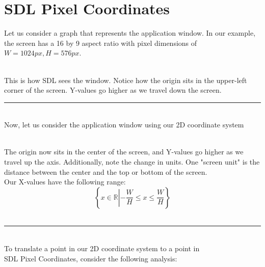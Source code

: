 \documentclass[11pt]{article}
\begin{document}
\section{SDL Pixel Coordinates}

Let us consider a graph that represents the application window.
In our example, the screen has a 16 by 9 aspect ratio with pixel
dimensions of $W=1024px, H=576px$.\\[5pt]

\\

This is how SDL sees the window. Notice how the origin sits in the
upper-left corner of the screen. Y-values go higher as we travel
down the screen.\\

\rule{12cm}{0.4pt}
\\

Now, let us consider the application window using our 2D coordinate
system\\

\\

The origin now sits in the center of the screen, and Y-values go higher
as we travel up the axis. Additionally, note the change in units.
One "screen unit" is the distance between the center and the top or
bottom of the screen.\\

Our X-values have the following range:\\

$$\left\{ x \in \mathbb{R} \left| -\frac{W}{H} \leq x \leq \frac{W}{H} \right. \right\}$$
\\

\rule{12cm}{0.4pt}
\\

To translate a point in our 2D coordinate system to a point in\\
SDL Pixel Coordinates, consider the following analysis:\\
\end{document}
